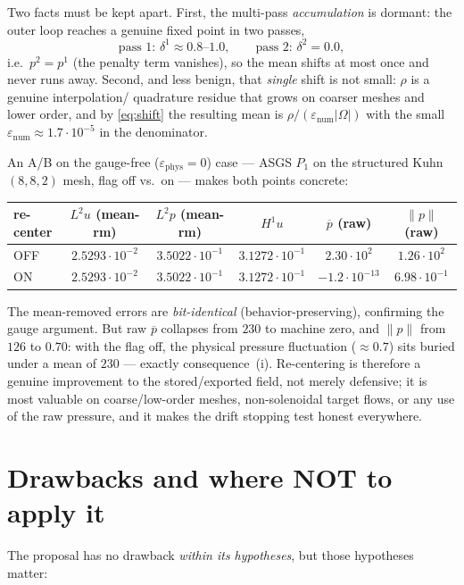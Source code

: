 \documentclass[11pt]{article}
\theoremstyle{plain}
\theoremstyle{remark}
\newcommand{\meas}{\lvert\Omega\rvert}
\newcommand{\enum}{\varepsilon_{\mathrm{num}}}
\newcommand{\ephys}{\varepsilon_{\mathrm{phys}}}
\newcommand{\norm}[1]{\lVert #1\rVert}
\begin{document}
Two facts must be kept apart. First, the multi-pass \emph{accumulation} is dormant: the outer loop reaches
a genuine fixed point in two passes,
\[
\text{pass 1: } \delta^{1}\approx0.8\text{--}1.0,\qquad \text{pass 2: } \delta^{2}=0.0,
\]
i.e.\ $p^{2}=p^{1}$ (the penalty term vanishes), so the mean shifts at most once and never runs away.
Second, and less benign, that \emph{single} shift is not small: $\rho$ is a genuine interpolation/
quadrature residue that grows on coarser meshes and lower order, and by \eqref{eq:shift} the resulting
mean is $\rho/(\enum\meas)$ with the small $\enum\approx1.7\cdot10^{-5}$ in the denominator.

An A/B on the gauge-free ($\ephys=0$) case --- ASGS $P_1$ on the structured Kuhn $(8,8,2)$ mesh, flag off
vs.\ on --- makes both points concrete:
\begin{center}
\begin{tabular}{lccccc}
\hline
re-center & $L^2u$ (mean-rm) & $L^2p$ (mean-rm) & $H^1u$ & $\overline{p}$ (raw) & $\norm{p}$ (raw)\\
\hline
OFF & $2.5293\!\cdot\!10^{-2}$ & $3.5022\!\cdot\!10^{-1}$ & $3.1272\!\cdot\!10^{-1}$ & $2.30\!\cdot\!10^{2}$ & $1.26\!\cdot\!10^{2}$\\
ON  & $2.5293\!\cdot\!10^{-2}$ & $3.5022\!\cdot\!10^{-1}$ & $3.1272\!\cdot\!10^{-1}$ & $-1.2\!\cdot\!10^{-13}$ & $6.98\!\cdot\!10^{-1}$\\
\hline
\end{tabular}
\end{center}
The mean-removed errors are \emph{bit-identical} (behavior-preserving), confirming the gauge argument. But
raw $\overline{p}$ collapses from $230$ to machine zero, and $\norm{p}$ from $126$ to $0.70$: with the flag
off, the physical pressure fluctuation ($\approx0.7$) sits buried under a mean of $230$ --- exactly
consequence~(i). Re-centering is therefore a genuine improvement to the stored/exported field, not merely
defensive; it is most valuable on coarse/low-order meshes, non-solenoidal target flows, or any use of the
raw pressure, and it makes the drift stopping test honest everywhere.

\section{Drawbacks and where NOT to apply it}
\label{sec:drawbacks}

The proposal has no drawback \emph{within its hypotheses}, but those hypotheses matter:
\end{document}
